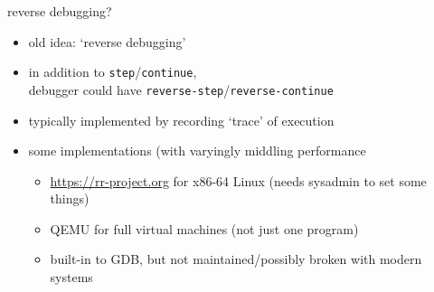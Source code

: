 
\begin{frame}{reverse debugging?}
    \begin{itemize}
    \item old idea: `reverse debugging'
    \item in addition to \texttt{step}/\texttt{continue}, \\
        debugger could have \texttt{reverse-step}/\texttt{reverse-continue}
    \item typically implemented by recording `trace' of execution
    \vspace{.5cm}
    \item some implementations (with varyingly middling performance
        \begin{itemize}
        \item \url{https://rr-project.org} for x86-64 Linux (needs sysadmin to set some things)
        \item QEMU for full virtual machines (not just one program)
        \item built-in to GDB, but not maintained/possibly broken with modern systems
        \end{itemize}
    \end{itemize}
\end{frame}


